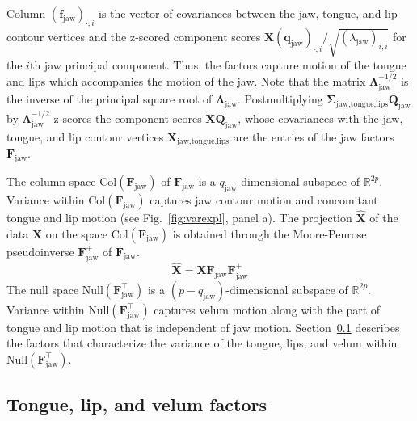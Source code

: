 \documentclass[preprint]{JASAnew}\usepackage[]{graphicx}\usepackage[]{color}
\begin{document}
%
Column $(\mathbf{f}_\text{jaw})_{\cdot,i}$ is the vector of covariances between the jaw, tongue, and lip contour vertices and the z-scored component scores $\mathbf{X} (\mathbf{q}_\text{jaw})_{\cdot,i} / \sqrt{(\lambda_\text{jaw})_{i,i}}$ for the $i$th jaw principal component. 
%
Thus, the factors capture motion of the tongue and lips which accompanies the motion of the jaw. 
%
Note that the matrix $\boldsymbol{\Lambda}_\text{jaw}^{-1/2}$ is the inverse of the principal square root of $\boldsymbol{\Lambda}_\text{jaw}$.
%
Postmultiplying $\boldsymbol{\Sigma}_\text{jaw,tongue,lips} \mathbf{Q}_\text{jaw}$ by $\boldsymbol{\Lambda}_\text{jaw}^{-1/2}$ z-scores the component scores $\mathbf{X}\mathbf{Q}_\text{jaw}$, whose covariances with the jaw, tongue, and lip contour vertices $\mathbf{X}_\text{jaw,tongue,lips}$ are the entries of the jaw factors $\mathbf{F}_\text{jaw}$.

The column space $\mathrm{Col}(\mathbf{F}_\text{jaw})$ of $\mathbf{F}_\text{jaw}$ is a $q_\text{jaw}$-dimensional subspace of $\mathbb{R}^{2p}$. 
%
Variance within $\mathrm{Col}(\mathbf{F}_\text{jaw})$ captures jaw contour motion and concomitant tongue and lip motion (see Fig.~\ref{fig:varexpl}, panel a).
%
The projection $\mathbf{\hat{X}}$ of the data $\mathbf{X}$ on the space $\mathrm{Col}(\mathbf{F}_\text{jaw})$ is obtained through the Moore-Penrose pseudoinverse $\mathbf{F}_\text{jaw}^+$ of $\mathbf{F}_\text{jaw}$. 
%
\begin{equation} \label{eq:XXuu}
\mathbf{\hat{X}} 
= \mathbf{X} 
  \mathbf{F}_\text{jaw}
  \mathbf{F}_\text{jaw}^+ 
\end{equation}
%
The null space $\mathrm{Null}(\mathbf{F}_\text{jaw}^\intercal)$ is a $(p-q_\text{jaw})$-dimensional subspace of $\mathbb{R}^{2p}$. 
% 
Variance within $\mathrm{Null}(\mathbf{F}_\text{jaw}^\intercal)$ captures velum motion along with the part of tongue and lip motion that is independent of jaw motion. 
%
Section~\ref{subsec:residfactors} describes the factors that characterize the variance of the tongue, lips, and velum within $\mathrm{Null} \left( \mathbf{F}_\text{jaw}^\intercal \right)$. 





\subsection{Tongue, lip, and velum factors}
\label{subsec:residfactors}
\end{document}
